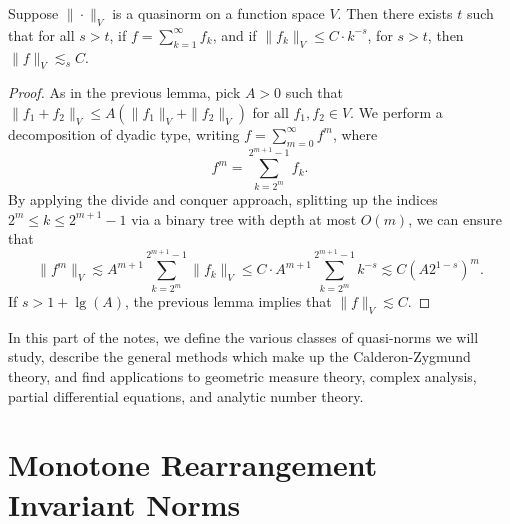 \begin{lemma}
    Suppose $\| \cdot \|_V$ is a quasinorm on a function space $V$. Then there exists $t$ such that for all $s > t$, if $f = \sum_{k = 1}^\infty f_k$, and if $\| f_k \|_V \leq C \cdot k^{-s}$, for $s > t$, then $\| f \|_V \lesssim_s C$.
\end{lemma}
\begin{proof}
    As in the previous lemma, pick $A > 0$ such that $\| f_1 + f_2 \|_V \leq A (\| f_1 \|_V + \| f_2 \|_V)$ for all $f_1,f_2 \in V$. We perform a decomposition of dyadic type, writing $f = \sum_{m = 0}^\infty f^m$, where
    \[ f^m = \sum_{k = 2^m}^{2^{m+1} - 1} f_k. \]
    By applying the divide and conquer approach, splitting up the indices $2^m \leq k \leq 2^{m+1} - 1$ via a binary tree with depth at most $O(m)$, we can ensure that
    \[ \| f^m \|_V \lesssim A^{m+1} \sum_{k = 2^m}^{2^{m+1} - 1} \| f_k \|_V \leq C \cdot A^{m+1} \sum_{k = 2^m}^{2^{m+1} - 1} k^{-s} \lesssim C (A 2^{1-s})^m. \]
    If $s > 1 + \lg(A)$, the previous lemma implies that $\| f \|_V \lesssim C$.
\end{proof}

In this part of the notes, we define the various classes of quasi-norms we will study, describe the general methods which make up the Calderon-Zygmund theory, and find applications to geometric measure theory, complex analysis, partial differential equations, and analytic number theory.





\chapter{Monotone Rearrangement Invariant Norms}


